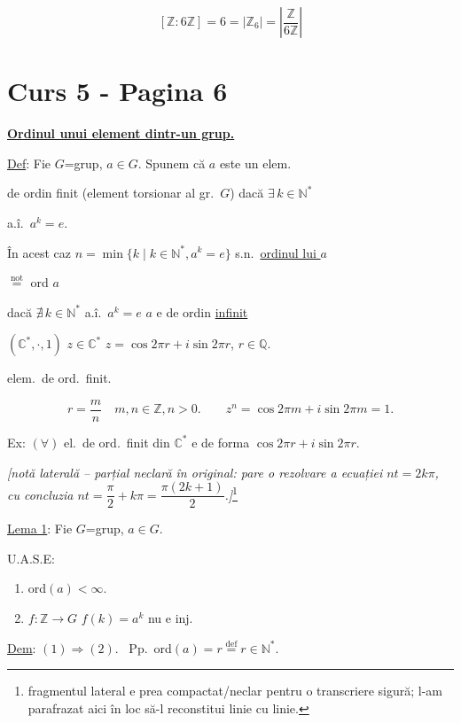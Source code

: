 \[
[\mathbb{Z}:6\mathbb{Z}] = 6 = |\mathbb{Z}_6| = \left|\frac{\mathbb{Z}}{6\mathbb{Z}}\right|
\]


\section*{Curs 5 - Pagina 6}

\noindent\underline{\textbf{Ordinul unui element dintr-un grup.}}

\bigskip
\noindent\underline{Def}: Fie $G$=grup, $a\in G$. Spunem că $a$ este un elem.

\noindent de ordin finit (element torsionar al gr.\ $G$) dacă $\exists\, k\in\mathbb{N}^*$

\noindent a.î.\ $a^k=e$.

\bigskip
\noindent În acest caz $n=\min\{k \mid k\in\mathbb{N}^*, a^k=e\}$ s.n.\ \underline{ordinul lui $a$}

\noindent $\overset{\text{not}}{=}$ ord $a$

\bigskip
\noindent dacă $\nexists\, k\in\mathbb{N}^*$ a.î.\ $a^k=e$ \quad $a$ e de ordin \underline{infinit}

\bigskip
\noindent $(\mathbb{C}^*,\cdot,1)$ \quad $z\in\mathbb{C}^*$ \quad $z=\cos 2\pi r + i\sin 2\pi r$, $r\in\mathbb{Q}$.

\noindent elem.\ de ord.\ finit.

\[
r=\frac{m}{n} \quad m,n\in\mathbb{Z}, n>0. \qquad z^n = \cos 2\pi m + i\sin 2\pi m = 1.
\]

\noindent Ex: $(\forall)$ el.\ de ord.\ finit din $\mathbb{C}^*$ e de forma $\cos 2\pi r+i\sin 2\pi r$.

\bigskip
\noindent \textit{[notă laterală -- parțial neclară în original: pare o rezolvare a ecuației $nt=2k\pi$, cu concluzia $nt=\dfrac{\pi}{2}+k\pi=\dfrac{\pi(2k+1)}{2}$.]}\footnote{fragmentul lateral e prea compactat/neclar pentru o transcriere sigură; l-am parafrazat aici în loc să-l reconstitui linie cu linie.}

\bigskip
\noindent\underline{Lema 1}: Fie $G$=grup, $a\in G$.

\noindent U.A.S.E:

\begin{enumerate}
\item[(1)] ord$(a)<\infty$.
\item[(2)] $f:\mathbb{Z}\to G$ \quad $f(k)=a^k$ nu e inj.
\end{enumerate}

\bigskip
\noindent\underline{Dem}: $(1)\Rightarrow(2)$. \ Pp.\ ord$(a)=r \overset{\text{def}}{=} r\in\mathbb{N}^*$.

